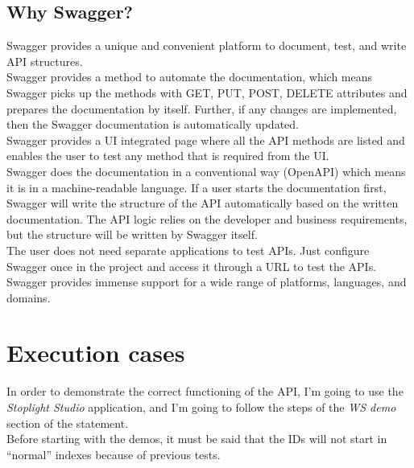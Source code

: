 \documentclass[a4paper,12pt]{article}
\begin{document}
\subsection*{Why Swagger?}
Swagger provides a unique and convenient platform to document, test, and write API structures.\\
Swagger provides a method to automate the documentation, which means Swagger picks up the methods with GET, PUT, POST, DELETE attributes and prepares the documentation by itself. Further, if any changes are implemented, then the Swagger documentation is automatically updated.\\
Swagger provides a UI integrated page where all the API methods are listed and enables the user to test any method that is required from the UI.\\
Swagger does the documentation in a conventional way (OpenAPI) which means it is in a machine-readable language. If a user starts the documentation first, Swagger will write the structure of the API automatically based on the written documentation. The API logic relies on the developer and business requirements, but the structure will be written by Swagger itself.\\
The user does not need separate applications to test APIs. Just configure Swagger once in the project and access it through a URL to test the APIs.\\
Swagger provides immense support for a wide range of platforms, languages, and domains.
\section*{Execution cases}
In order to demonstrate the correct functioning of the API, I'm going to use the \textit{Stoplight Studio} application, and I'm going to follow the steps of the \textit{WS demo} section of the statement.\\
Before starting with the demos, it must be said that the IDs will not start in “normal” indexes because of previous tests.
\end{document}
